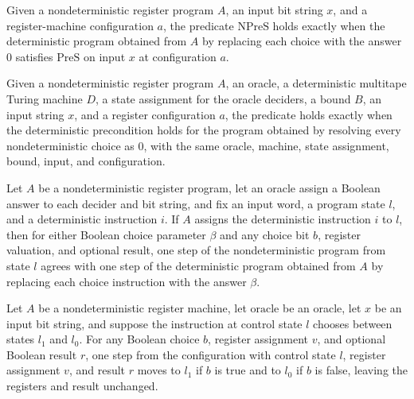 \begin{definition}
\label{Complexity.LogProg.NPreS}
\leanok
{}
Given a nondeterministic register program $A$, an input bit string $x$, and a
register-machine configuration $a$, the predicate $\mathrm{NPreS}$ holds exactly when
the deterministic program obtained from $A$ by replacing each choice with the answer $0$
satisfies $\mathrm{PreS}$ on input $x$ at configuration $a$.
\end{definition}

\begin{definition}
\label{Complexity.LogProg.NPre}
\leanok
{}
Given a nondeterministic register program $A$, an oracle, a deterministic multitape
Turing machine $D$, a state assignment for the oracle deciders, a bound $B$, an input
string $x$, and a register configuration $a$, the predicate holds exactly when the
deterministic precondition holds for the program obtained by resolving every
nondeterministic choice as $0$, with the same oracle, machine, state assignment, bound,
input, and configuration.
\end{definition}

\begin{lemma}
\label{Complexity.LogProg.nastep_det}
\leanok
{}
Let $A$ be a nondeterministic register program, let an oracle assign a Boolean answer to
each decider and bit string, and fix an input word, a program state $l$, and a
deterministic instruction $i$. If $A$ assigns the deterministic instruction $i$ to $l$,
then for either Boolean choice parameter $\beta$ and any choice bit $b$, register
valuation, and optional result, one step of the nondeterministic program from state $l$
agrees with one step of the deterministic program obtained from $A$ by replacing each
choice instruction with the answer $\beta$.
\end{lemma}

\begin{lemma}
\label{Complexity.LogProg.nastep_choose}
\leanok
{}
Let $A$ be a nondeterministic register machine, let $\text{oracle}$ be an oracle, let
$x$ be an input bit string, and suppose the instruction at control state $l$ chooses
between states $l_1$ and $l_0$. For any Boolean choice $b$, register assignment $v$, and
optional Boolean result $r$, one step from the configuration with control state $l$,
register assignment $v$, and result $r$ moves to $l_1$ if $b$ is true and to $l_0$ if
$b$ is false, leaving the registers and result unchanged.
\end{lemma}

